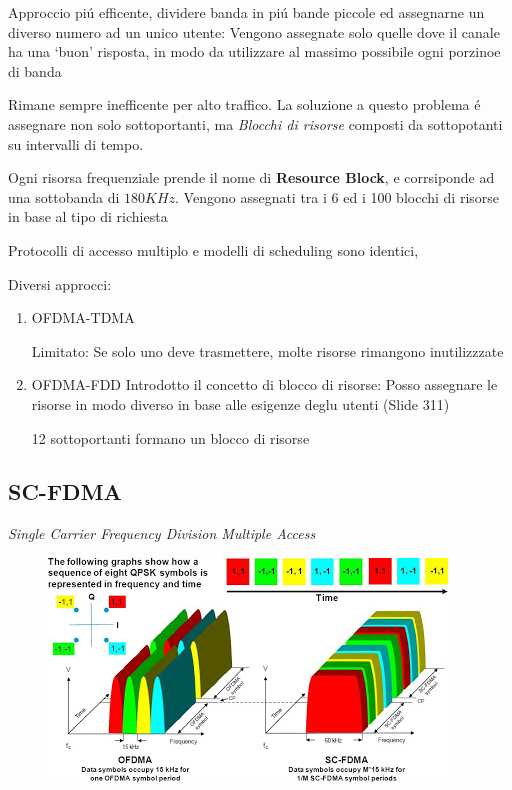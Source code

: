 \documentclass{article}
\begin{document}
Approccio pi\'u efficente, dividere banda in pi\'u bande piccole ed assegnarne un diverso numero ad un unico utente:
Vengono assegnate solo quelle dove il canale ha una `buon' risposta, in modo da utilizzare al massimo possibile ogni porzinoe di banda

Rimane sempre inefficente per alto traffico. La soluzione a questo problema \'e assegnare non solo sottoportanti, ma \textit{Blocchi di risorse} composti da sottopotanti su intervalli di tempo.

Ogni risorsa frequenziale prende il nome di \textbf{Resource Block}, e corrsiponde ad una sottobanda di $180KHz$.
Vengono assegnati tra i 6 ed i 100 blocchi di risorse in base al tipo di richiesta

Protocolli di accesso multiplo e modelli di scheduling sono identici,


Diversi approcci:
\begin{enumerate}
    \item OFDMA-TDMA

        Limitato:
        Se solo uno deve trasmettere, molte risorse rimangono inutilizzzate

    \item OFDMA-FDD
        Introdotto il concetto di blocco di risorse:
        Posso assegnare le risorse in modo diverso in base alle esigenze deglu utenti (Slide 311)

        12 sottoportanti formano un blocco di risorse

\end{enumerate}

\subsection{SC-FDMA}
\textit{Single Carrier Frequency Division Multiple Access}
\begin{figure}[h]
    \includegraphics{img/sdt/sc_fdma}
    \centering
\end{figure}
\end{document}
